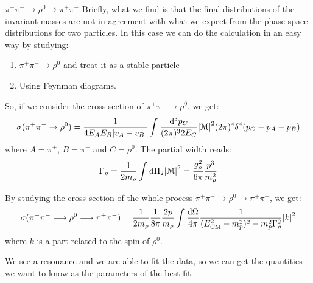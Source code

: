 \documentclass[../../main/main.tex]{subfiles}
\begin{document}
\begin{example}{\( \pi^+\pi^- \longrightarrow \rho^0 \longrightarrow \pi^+\pi^- \)}{}
    Briefly, what we find is that the final distributions of the invariant masses are not in agreement with what we expect from the phase space distributions for two particles. In this case we can do the calculation in an easy way by studying:
    \begin{enumerate}
        \item \( \pi^+\pi^- \longrightarrow \rho^0 \) and treat it as a stable particle
        \item Using Feynman diagrams.
    \end{enumerate}
	So, if we consider the cross section of \( \pi^+\pi^- \longrightarrow \rho^0 \), we get:
    \begin{equation}
        \sigma(\pi^+\pi^- \rightarrow \rho^0)
        =
        \frac{1}{4 E_A E_B \abs{v_A - v_B}} \int_{}^{} \frac{\mathrm{d}{^3p_C}}{(2\pi)^3 2 E_C} \abs{\mathcal{M}}^2 (2 \pi)^4 \delta^4(p_C - p_A - p_B)
        \label{eq:L03_PPRCS}
    \end{equation}
    where \( A = \pi^+ \), \( B = \pi^- \) and \( C = \rho^0 \). The partial width reads:
    \begin{equation}
        \Gamma_{\rho}
        =
        \frac{1}{2 m_{\rho}} \int_{}^{} \mathrm{d}{\Pi_2} \abs{\mathcal{M}}^2
		=
		\frac{g_{\rho}^2}{6\pi} \frac{p^3}{m_{\rho}^2}
        \label{eq:L03_RPW}
    \end{equation}

	By studying the cross section of the whole process \( \pi^+\pi^- \longrightarrow \rho^0 \longrightarrow \pi^+\pi^- \), we get:
    \begin{equation}
        \sigma(\pi^+\pi^- \longrightarrow \rho^0 \longrightarrow \pi^+\pi^-)
        =
        \frac{1}{2m_{\rho}} \frac{1}{8\pi} \frac{2p}{m_{\rho}} \int_{}^{} \frac{\mathrm{d}{\Omega}}{4\pi} \frac{1}{(E^2_\mathrm{CM} - m^2_p)^2 - m^2_p \Gamma^2_{\rho}} \abs{k}^2
        \label{eq:L03_PPRPPCS}
    \end{equation}
    where \( k \) is a part related to the spin of \( \rho^0 \).

    We see a resonance and we are able to fit the data, so we can get the quantities we want to know as the parameters of the best fit.
\end{example}
\end{document}
